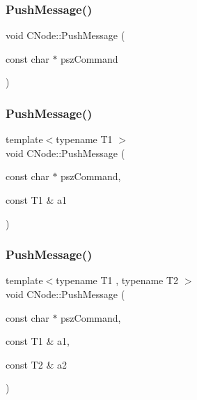 \subsubsection{\texorpdfstring{Push\+Message()}{PushMessage()}\hspace{0.1cm}{\footnotesize\ttfamily [1/13]}}
{\footnotesize\ttfamily void C\+Node\+::\+Push\+Message (\begin{DoxyParamCaption}\item[{const char $\ast$}]{psz\+Command }\end{DoxyParamCaption})\hspace{0.3cm}{\ttfamily [inline]}}

\mbox{\label{class_c_node_a07f897794e362a214a1d4d2aa3d68939}} 
\subsubsection{\texorpdfstring{Push\+Message()}{PushMessage()}\hspace{0.1cm}{\footnotesize\ttfamily [2/13]}}
{\footnotesize\ttfamily template$<$typename T1 $>$ \\
void C\+Node\+::\+Push\+Message (\begin{DoxyParamCaption}\item[{const char $\ast$}]{psz\+Command,  }\item[{const T1 \&}]{a1 }\end{DoxyParamCaption})\hspace{0.3cm}{\ttfamily [inline]}}

\mbox{\label{class_c_node_a67b985781651b8806d7f9976f6fb85a9}} 
\subsubsection{\texorpdfstring{Push\+Message()}{PushMessage()}\hspace{0.1cm}{\footnotesize\ttfamily [3/13]}}
{\footnotesize\ttfamily template$<$typename T1 , typename T2 $>$ \\
void C\+Node\+::\+Push\+Message (\begin{DoxyParamCaption}\item[{const char $\ast$}]{psz\+Command,  }\item[{const T1 \&}]{a1,  }\item[{const T2 \&}]{a2 }\end{DoxyParamCaption})\hspace{0.3cm}{\ttfamily [inline]}}

